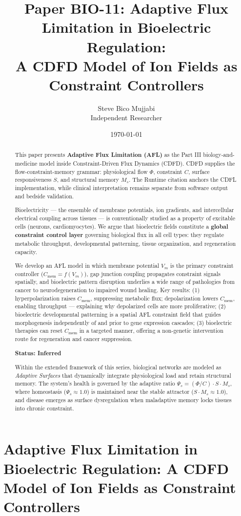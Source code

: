 \documentclass[12pt,a4paper]{article}
\title{\textbf{Paper BIO-11: Adaptive Flux Limitation in Bioelectric Regulation:\\ A CDFD Model of Ion Fields as Constraint Controllers}}
\author{Steve Bico Mujjabi\\ \small Independent Researcher}
\date{\today}
\begin{document}
\maketitle

\clearpage
\section*{Adaptive Flux Limitation in Bioelectric Regulation: A CDFD Model of Ion Fields as Constraint Controllers}

\begin{abstract}

This paper presents \textbf{Adaptive Flux Limitation (AFL)} as the Part III biology-and-medicine model inside Constraint-Driven Flux Dynamics (CDFD). CDFD supplies the flow-constraint-memory grammar: physiological flow $\Phi$, constraint $C$, surface responsiveness $S$, and structural memory $M_s$. The Runtime citation anchors the CDFL implementation, while clinical interpretation remains separate from software output and bedside validation.

Bioelectricity --- the ensemble of membrane potentials, ion gradients, and intercellular electrical coupling across tissues --- is conventionally studied as a property of excitable cells (neurons, cardiomyocytes). We argue that bioelectric fields constitute a \textbf{global constraint control layer} governing biological flux in all cell types: they regulate metabolic throughput, developmental patterning, tissue organization, and regeneration capacity.

We develop an AFL model in which membrane potential $V_m$ is the primary constraint controller ($C_{\mathrm{mem}} = f(V_m)$), gap junction coupling propagates constraint signals spatially, and bioelectric pattern disruption underlies a wide range of pathologies from cancer to neurodegeneration to impaired wound healing. Key results: (1) hyperpolarization raises $C_{\mathrm{mem}}$, suppressing metabolic flux; depolarization lowers $C_{\mathrm{mem}}$, enabling throughput --- explaining why depolarized cells are more proliferative; (2) bioelectric developmental patterning is a spatial AFL constraint field that guides morphogenesis independently of and prior to gene expression cascades; (3) bioelectric therapies can reset $C_{\mathrm{mem}}$ in a targeted manner, offering a non-genetic intervention route for regeneration and cancer suppression.

\textbf{Status: Inferred}

\medskip
\noindent Within the extended framework of this series, biological networks are modeled as \emph{Adaptive Surfaces} that dynamically integrate physiological load and retain structural memory. The system's health is governed by the adaptive ratio $\Psi_s = (\Phi/C) \cdot S \cdot M_s$, where homeostasis ($\Psi_s \approx 1.0$) is maintained near the stable attractor ($S \cdot M_s \approx 1.0$), and disease emerges as surface dysregulation when maladaptive memory locks tissues into chronic constraint.

\end{abstract}
\end{document}
